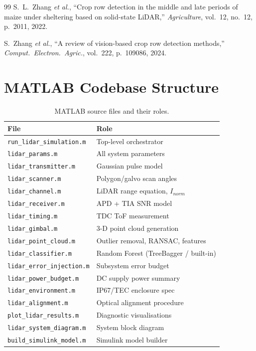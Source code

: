 \documentclass[12pt,a4paper]{article}
\begin{document}
\begin{thebibliography}{99}
S.~L.~Zhang \textit{et al.},
``Crop row detection in the middle and late periods of maize under sheltering based on solid-state LiDAR,''
\textit{Agriculture}, vol.~12, no.~12, p.~2011, 2022.

S.~Zhang \textit{et al.},
``A review of vision-based crop row detection methods,''
\textit{Comput.\ Electron.\ Agric.}, vol.~222, p.~109086, 2024.

\end{thebibliography}

\appendix
\section{MATLAB Codebase Structure}

\begin{table}[H]
\centering
\caption{MATLAB source files and their roles.}
\label{tab:files}
\begin{tabular}{ll}
\toprule
\textbf{File} & \textbf{Role} \\
\midrule
\texttt{run\_lidar\_simulation.m} & Top-level orchestrator \\
\texttt{lidar\_params.m}          & All system parameters \\
\texttt{lidar\_transmitter.m}     & Gaussian pulse model \\
\texttt{lidar\_scanner.m}         & Polygon/galvo scan angles \\
\texttt{lidar\_channel.m}         & LiDAR range equation, $I_{norm}$ \\
\texttt{lidar\_receiver.m}        & APD + TIA SNR model \\
\texttt{lidar\_timing.m}          & TDC ToF measurement \\
\texttt{lidar\_gimbal.m}          & 3-D point cloud generation \\
\texttt{lidar\_point\_cloud.m}    & Outlier removal, RANSAC, features \\
\texttt{lidar\_classifier.m}      & Random Forest (TreeBagger / built-in) \\
\texttt{lidar\_error\_injection.m}& Subsystem error budget \\
\texttt{lidar\_power\_budget.m}   & DC supply power summary \\
\texttt{lidar\_environment.m}     & IP67/TEC enclosure spec \\
\texttt{lidar\_alignment.m}       & Optical alignment procedure \\
\texttt{plot\_lidar\_results.m}   & Diagnostic visualisations \\
\texttt{lidar\_system\_diagram.m} & System block diagram \\
\texttt{build\_simulink\_model.m} & Simulink model builder \\
\bottomrule
\end{tabular}
\end{table}
\end{document}
